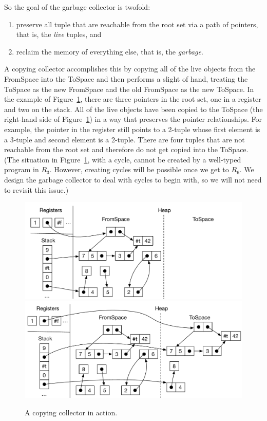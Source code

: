 \documentclass[11pt]{book}
\begin{document}
So the goal of the garbage collector is twofold:
\begin{enumerate}
\item preserve all tuple that are reachable from the root set via a
  path of pointers, that is, the \emph{live} tuples, and
\item reclaim the memory of everything else, that is, the
  \emph{garbage}.
\end{enumerate}
A copying collector accomplishes this by copying all of the live
objects from the FromSpace into the ToSpace and then performs a slight
of hand, treating the ToSpace as the new FromSpace and the old
FromSpace as the new ToSpace.  In the example of
Figure~\ref{fig:copying-collector}, there are three pointers in the
root set, one in a register and two on the stack.  All of the live
objects have been copied to the ToSpace (the right-hand side of
Figure~\ref{fig:copying-collector}) in a way that preserves the
pointer relationships. For example, the pointer in the register still
points to a 2-tuple whose first element is a 3-tuple and second
element is a 2-tuple.  There are four tuples that are not reachable
from the root set and therefore do not get copied into the ToSpace.
(The situation in Figure~\ref{fig:copying-collector}, with a
cycle, cannot be created by a well-typed program in $R_3$. However,
creating cycles will be possible once we get to $R_6$.  We design
the garbage collector to deal with cycles to begin with, so we will
not need to revisit this issue.)

\begin{figure}[tbp]
\centering
\includegraphics[width=\textwidth]{figs/copy-collect-1} \\[5ex]
\includegraphics[width=\textwidth]{figs/copy-collect-2}
\caption{A copying collector in action.}
\label{fig:copying-collector}
\end{figure}
\end{document}
